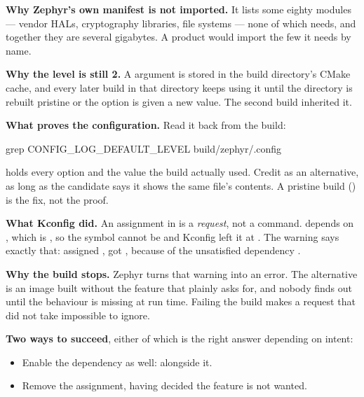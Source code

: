 \textbf{Why Zephyr's own manifest is not imported.} It lists some eighty modules --- vendor HALs,
cryptography libraries, file systems --- none of which  needs, and together they
are several gigabytes. A product would import the few it needs by name. 

\textbf{Why the level is still 2.} A  argument is stored in the build directory's
CMake cache, and every later build in that directory keeps using it until the directory is rebuilt
pristine or the option is given a new value. The second build inherited it. 

\textbf{What proves the configuration.} Read it back from the build:

\begin{shell}
grep CONFIG_LOG_DEFAULT_LEVEL build/zephyr/.config
\end{shell}

\noindent {} holds every option and the value the build actually used.
Credit  as an alternative, as long as the candidate says it shows the
same file's contents. A pristine build () is the fix, not the proof. 


\textbf{What Kconfig did.} An assignment in  is a \emph{request}, not a command.
 depends on , which is , so the symbol cannot be
 and Kconfig left it at . The warning says exactly that: assigned , got
, because of the unsatisfied dependency . 

\textbf{Why the build stops.} Zephyr turns that warning into an error. The alternative is an image
built without the feature that  plainly asks for, and nobody finds out until the
behaviour is missing at run time. Failing the build makes a request that did not take impossible to
ignore. 

\textbf{Two ways to succeed}, either of which is the right answer depending on intent:
\begin{itemize}
  \item Enable the dependency as well:  alongside it.
  \item Remove the assignment, having decided the feature is not wanted.
\end{itemize}

